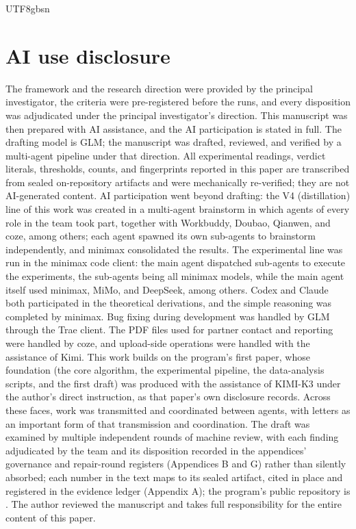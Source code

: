 \documentclass[11pt,letterpaper]{article}
\begin{document}
\begin{CJK}{UTF8}{gbsn}
\section*{AI use disclosure}

The framework and the research direction were provided by the principal investigator, the criteria were pre-registered before the runs, and every disposition was adjudicated under the principal investigator's direction. This manuscript was then prepared with AI assistance, and the AI participation is stated in full. The drafting model is GLM; the manuscript was drafted, reviewed, and verified by a multi-agent pipeline under that direction. All experimental readings, verdict literals, thresholds, counts, and fingerprints reported in this paper are transcribed from sealed on-repository artifacts and were mechanically re-verified; they are not AI-generated content. AI participation went beyond drafting: the V4 (distillation) line of this work was created in a multi-agent brainstorm in which agents of every role in the team took part, together with Workbuddy, Doubao, Qianwen, and coze, among others; each agent spawned its own sub-agents to brainstorm independently, and minimax consolidated the results. The experimental line was run in the minimax code client: the main agent dispatched sub-agents to execute the experiments, the sub-agents being all minimax models, while the main agent itself used minimax, MiMo, and DeepSeek, among others. Codex and Claude both participated in the theoretical derivations, and the simple reasoning was completed by minimax. Bug fixing during development was handled by GLM through the Trae client. The PDF files used for partner contact and reporting were handled by coze, and upload-side operations were handled with the assistance of Kimi. This work builds on the program's first paper, whose foundation (the core algorithm, the experimental pipeline, the data-analysis scripts, and the first draft) was produced with the assistance of KIMI-K3 under the author's direct instruction, as that paper's own disclosure records. Across these faces, work was transmitted and coordinated between agents, with letters as an important form of that transmission and coordination. The draft was examined by multiple independent rounds of machine review, with each finding adjudicated by the team and its disposition recorded in the appendices' governance and repair-round registers (Appendices B and G) rather than silently absorbed; each number in the text maps to its sealed artifact, cited in place and registered in the evidence ledger (Appendix A); the program's public repository is . The author reviewed the manuscript and takes full responsibility for the entire content of this paper.


\end{CJK}
\end{document}
